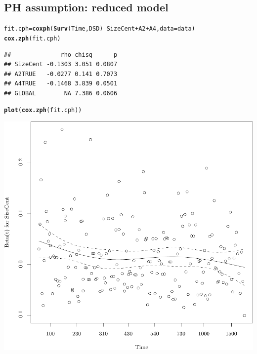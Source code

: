 \documentclass{article}\usepackage[]{graphicx}\usepackage[]{color}
\makeatletter
\def\maxwidth{ %
  \ifdim\Gin@nat@width>\linewidth
    \linewidth
  \else
    \Gin@nat@width
  \fi
}
\newcommand{\hlopt}[1]{\textcolor[rgb]{0,0,0}{#1}}%
\newcommand{\hlstd}[1]{\textcolor[rgb]{0.345,0.345,0.345}{#1}}%
\newcommand{\hlkwb}[1]{\textcolor[rgb]{0.69,0.353,0.396}{#1}}%
\newcommand{\hlkwc}[1]{\textcolor[rgb]{0.333,0.667,0.333}{#1}}%
\newcommand{\hlkwd}[1]{\textcolor[rgb]{0.737,0.353,0.396}{\textbf{#1}}}%
\newenvironment{kframe}{%
 \def\at@end@of@kframe{}%
 \ifinner\ifhmode%
  \def\at@end@of@kframe{\end{minipage}}%
  \begin{minipage}{\columnwidth}%
 \fi\fi%
 \def\FrameCommand##1{\hskip\@totalleftmargin \hskip-\fboxsep
 \colorbox{shadecolor}{##1}\hskip-\fboxsep
     \hskip-\linewidth \hskip-\@totalleftmargin \hskip\columnwidth}%
 \MakeFramed {\advance\hsize-\width
   \@totalleftmargin\z@ \linewidth\hsize
   \@setminipage}}%
 {\par\unskip\endMakeFramed%
 \at@end@of@kframe}
\newenvironment{knitrout}{}{} %
\makeatother
\begin{document}
\subsection{PH assumption: reduced model}
\begin{knitrout}
\color{fgcolor}\begin{kframe}
\begin{alltt}
\hlstd{fit.cph} \hlkwb{=} \hlkwd{coxph}\hlstd{(}\hlkwd{Surv}\hlstd{(Time, DSD)} \hlopt{~} \hlstd{SizeCent} \hlopt{+} \hlstd{A2} \hlopt{+} \hlstd{A4,} \hlkwc{data} \hlstd{= data)}
\hlkwd{cox.zph}\hlstd{(fit.cph)}
\end{alltt}
\begin{verbatim}
##              rho chisq      p
## SizeCent -0.1303 3.051 0.0807
## A2TRUE   -0.0277 0.141 0.7073
## A4TRUE   -0.1468 3.839 0.0501
## GLOBAL        NA 7.386 0.0606
\end{verbatim}
\begin{alltt}
\hlkwd{plot}\hlstd{(}\hlkwd{cox.zph}\hlstd{(fit.cph))}
\end{alltt}
\end{kframe}

{\centering \includegraphics[width=\maxwidth]{figure/05-eda-ph-check-reduced-1} 

}





\end{knitrout}
\end{document}

